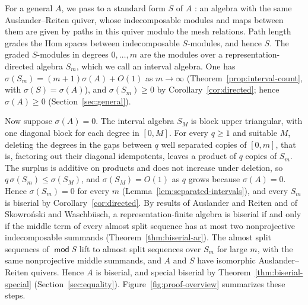 \documentclass[a4paper,reqno,10pt]{amsart}
\theoremstyle{definition}
\numberwithin{equation}{section}
\DeclareMathOperator{\moduleCategory}{\mathsf{mod}}
\renewcommand{\mod}{\moduleCategory}
\begin{document}
For a general \(A\), we pass to a standard form \(S\) of \(A\)
\cite{BG,BrG}: an algebra with the same Auslander--Reiten quiver, whose
indecomposable modules and maps between them are given by paths in this
quiver modulo the mesh relations. Path length grades the Hom spaces
between indecomposable \(S\)-modules, and hence \(S\). The graded \(S\)-modules in degrees
\(0,\ldots,m\) are the modules over a representation-directed algebra
\(S_m\), which we call an interval algebra. One has
\(\sigma(S_m)=(m+1)\sigma(A)+O(1)\) as \(m\to\infty\)
(Theorem~\ref{prop:interval-count}, with \(\sigma(S)=\sigma(A)\)), and
\(\sigma(S_m)\geq0\) by Corollary~\ref{cor:directed}; hence \(\sigma(A)\geq0\)
(Section~\ref{sec:general}).

Now suppose \(\sigma(A)=0\). The interval algebra \(S_M\) is block upper
triangular, with one diagonal block for each degree in \([0,M]\). For
every \(q\geq1\) and suitable \(M\), deleting the degrees in the gaps
between \(q\) well separated copies of \([0,m]\), that is, factoring out
their diagonal idempotents, leaves a product of \(q\) copies of \(S_m\). The surplus is additive on products and does not
increase under deletion, so \(q\,\sigma(S_m)\leq\sigma(S_M)\), and
\(\sigma(S_M)=O(1)\) as \(q\) grows because \(\sigma(A)=0\).
Hence \(\sigma(S_m)=0\) for every \(m\)
(Lemma~\ref{lem:separated-intervals}), and every \(S_m\) is biserial by
Corollary~\ref{cor:directed}. By results of Auslander and Reiten and of
Skowro\'nski and Waschb\"usch, a representation-finite algebra is
biserial if and only if the middle term of every almost split sequence
has at most two nonprojective indecomposable summands
(Theorem~\ref{thm:biserial-ar}).
The almost split sequences of \(\mod S\) lift to almost split sequences
over \(S_m\) for large \(m\), with the same nonprojective middle
summands, and \(A\) and \(S\) have isomorphic Auslander--Reiten quivers.
Hence \(A\) is biserial, and special biserial by
Theorem~\ref{thm:biserial-special} (Section~\ref{sec:equality}).
Figure~\ref{fig:proof-overview} summarizes these steps.
\end{document}
